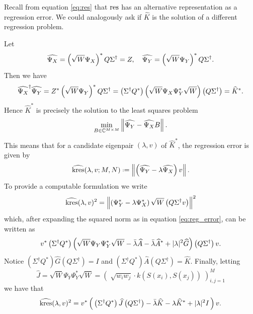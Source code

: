 Recall from equation \ref{eq:res} that $\text{res}$ has an alternative representation as 
a regression error. We could analogously ask if $\widehat{K}$ is the solution of a different 
regression problem. 

Let 
\begin{equation}
    \widehat{\Psi_X} = \left( \sqrt{W} \Psi_X \right)^* Q \Sigma^\dagger = Z, \quad 
    \widehat{\Psi_Y} = \left( \sqrt{W} \Psi_Y \right)^* Q \Sigma^\dagger . 
\end{equation}
Then we have 
\begin{equation}
    \widehat{\Psi_X}^\dagger \widehat{\Psi_Y} 
    = Z^* \left( \sqrt{W} \Psi_Y \right)^* Q \Sigma^\dagger
    = \left( \Sigma^\dagger Q^* \right) \left( \sqrt{W} \Psi_X \Psi_Y^* \sqrt{W} \right) \left( Q \Sigma^\dagger \right)
    = \widehat{K}^* . 
\end{equation}
Hence $\widehat{K}^*$ is precisely the solution to the least squares problem 
\begin{equation}
    \min_{B \in \mathbb{C}^{M \times M}} \left\| \widehat{\Psi_Y} - \widehat{\Psi_X} B \right\| . 
\end{equation}
This means that for a candidate eigenpair $(\lambda, v)$ of $\widehat{K}^*$, the regression 
error is given by 
\begin{equation}
    \widehat{ \kres } (\lambda, v; M, N) \defeq 
    \left\| \left( \widehat{ \YY } - \lambda \widehat{ \YX } \right) v \right\| . 
\end{equation}
To provide a computable formulation we write
\begin{equation}
    \widehat{ \text{kres} } (\lambda, v)^2
    = \left\| \left( \Psi_Y^* - \lambda \Psi_X^* \right) \sqrt{W}
    \left( Q \Sigma^\dagger v \right) \right\|^2 
\end{equation}
which, after expanding the squared norm as in equation \ref{eq:reg_error}, can be 
written as 
\begin{equation}
    \label{eq:res_hat_expanded}
    v^* \left( \Sigma^\dagger Q^* \right) 
    \left( 
        \sqrt{W} \Psi_Y \Psi_Y^* \sqrt{W} 
        - \bar{\lambda} \widehat{ A } 
        - \bar{\lambda} \widehat{ A }^* 
        + | \lambda |^2 \widehat{ G }
    \right)
    \left( Q \Sigma^\dagger \right) v . 
\end{equation}
Notice $\left( \Sigma^\dagger Q^* \right) \widehat{ G } \left( Q \Sigma^\dagger \right) 
= I$ and $\left( \Sigma^\dagger Q^* \right) \widehat{ A } \left( Q \Sigma^\dagger \right) 
= \widehat{ K }$. Finally, letting 
\begin{equation}
    \label{eq:J_hat}
    \widehat{ J } = 
    \sqrt{W} \Psi_Y \Psi_Y^* \sqrt{W}
    = \left(\; \sqrt{w_i w_j} \cdot k(S(x_i), S(x_j)) \;\right)_{i, j=1}^M 
\end{equation}
we have that 
\begin{equation}
    \label{eq:res_hat_min}
    \widehat{ \text{kres} } (\lambda, v)^2
    = v^* \left(\, 
        \left( \Sigma^\dagger Q^* \right) \widehat{ J } \left( Q \Sigma^\dagger \right)
        - \bar{\lambda} \widehat{ K } 
        - \lambda \widehat{ K }^* 
        + | \lambda |^2 I
    \,\right) v . 
\end{equation}

